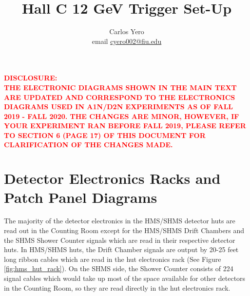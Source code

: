 \documentclass[11pt]{article}
\begin{document}
\newcommand{\hhodthrs}{-44.5 mV }       %
\newcommand{\hhodgate}{60 ns }
\newcommand{\hPrShLo}{-40 mV }
\newcommand{\hPrShHi}{-60 mV }
\newcommand{\hSHLo}{-45 mV }
\newcommand{\hPrShLogate}{30 ns }
\newcommand{\hPrShHigate}{30 ns }
\newcommand{\hSHLogate}{30 ns }
\newcommand{\hcerthrs}{-50 mV }
\newcommand{\hcergate}{30 ns }

\newcommand{\shodthrs}{-30 mV }
\newcommand{\quartzthrs}{-60 mV }
\newcommand{\shodgate}{60 ns } 
\newcommand{\sngcthrs}{-50 mV}
\newcommand{\sngcgate}{30 ns}
\newcommand{\shgcthrs}{-50 mV}
\newcommand{\shgcgate}{30 ns}
\newcommand{\saerthrs}{-50 mV}
\newcommand{\saergate}{30 ns}
\newcommand{\comment}[1]{}

\begin{center}
  \textbf{\noindent \large \textcolor{red}{DISCLOSURE: \\ THE ELECTRONIC DIAGRAMS SHOWN IN THE MAIN TEXT ARE UPDATED AND CORRESPOND TO THE ELECTRONICS DIAGRAMS USED IN A1N/D2N EXPERIMENTS AS OF FALL 2019 - FALL 2020. THE CHANGES ARE MINOR, HOWEVER, IF YOUR EXPERIMENT RAN BEFORE FALL 2019, PLEASE REFER TO SECTION 6 (PAGE 17) OF THIS DOCUMENT FOR CLARIFICATION OF THE CHANGES MADE.}}
\end{center}
\newpage

\title{\LARGE \bf{Hall C 12 GeV Trigger Set-Up}}

\author{Carlos Yero \\ email \href{mailto:cyero002@fiu.edu}{cyero002@fiu.edu}}

\maketitle



\section{Detector Electronics Racks and Patch Panel Diagrams}
The majority of the detector electronics in the HMS/SHMS detector huts are read out in the Counting Room except for the HMS/SHMS Drift
Chambers and the SHMS Shower Counter signals which are read in their respective detector huts. In HMS/SHMS huts, the Drift
Chamber signals are output by 20-25 feet long ribbon cables which are read in the hut electronics rack (See Figure \ref{fig:hms_hut_rack}). On the SHMS
side, the Shower Counter consists of 224 signal cables which would take up most of the space available for other detectors
in the Counting Room, so they are read directly in the hut electronics rack.
\end{document}
